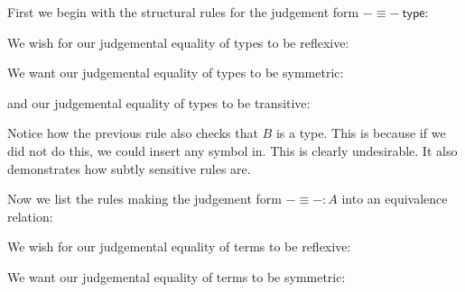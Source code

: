 First we begin with the structural rules for the judgement form $- \equiv -\ \mathsf{type}$:

\begin{defin}

    We wish for our judgemental equality of types to be reflexive:
    \begin{prooftree}
    \end{prooftree}

    We want our judgemental equality of types to be symmetric:
    \begin{prooftree}
    \end{prooftree}

    and our judgemental equality of types to be transitive:

    \begin{prooftree}
    \end{prooftree}

    Notice how the previous rule also checks that $B$ is a type. This is because if we did not do this, we could insert any symbol in. This is clearly undesirable. It also demonstrates how subtly sensitive rules are.

    Now we list the rules making the judgement form $- \equiv - : A$ into an equivalence relation:

    We wish for our judgemental equality of terms to be reflexive:
    \begin{prooftree}
    \end{prooftree}

    We want our judgemental equality of terms to be symmetric:
    \begin{prooftree}
    \end{prooftree}


\end{defin}
